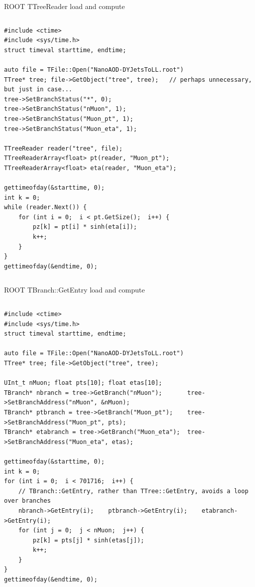 \documentclass[aspectratio=169]{beamer}
\begin{document}
\begin{frame}[fragile]{ROOT TTreeReader load and compute}
\scriptsize
\begin{columns}
\begin{verbatim}
#include <ctime>
#include <sys/time.h>
struct timeval starttime, endtime;

auto file = TFile::Open("NanoAOD-DYJetsToLL.root")
TTree* tree; file->GetObject("tree", tree);   // perhaps unnecessary, but just in case...
tree->SetBranchStatus("*", 0);
tree->SetBranchStatus("nMuon", 1);
tree->SetBranchStatus("Muon_pt", 1);
tree->SetBranchStatus("Muon_eta", 1);

TTreeReader reader("tree", file);
TTreeReaderArray<float> pt(reader, "Muon_pt");
TTreeReaderArray<float> eta(reader, "Muon_eta");

gettimeofday(&starttime, 0);
int k = 0;
while (reader.Next()) {
    for (int i = 0;  i < pt.GetSize();  i++) {
        pz[k] = pt[i] * sinh(eta[i]);
        k++;
    }
}
gettimeofday(&endtime, 0);
\end{verbatim}
\end{columns}
\end{frame}

\begin{frame}[fragile]{ROOT TBranch::GetEntry load and compute}
\vspace{0.2 cm}
\scriptsize
\begin{columns}
\begin{verbatim}
#include <ctime>
#include <sys/time.h>
struct timeval starttime, endtime;

auto file = TFile::Open("NanoAOD-DYJetsToLL.root")
TTree* tree; file->GetObject("tree", tree);

UInt_t nMuon; float pts[10]; float etas[10];
TBranch* nbranch = tree->GetBranch("nMuon");       tree->SetBranchAddress("nMuon", &nMuon);
TBranch* ptbranch = tree->GetBranch("Muon_pt");    tree->SetBranchAddress("Muon_pt", pts);
TBranch* etabranch = tree->GetBranch("Muon_eta");  tree->SetBranchAddress("Muon_eta", etas);

gettimeofday(&starttime, 0);
int k = 0;
for (int i = 0;  i < 701716;  i++) {
    // TBranch::GetEntry, rather than TTree::GetEntry, avoids a loop over branches
    nbranch->GetEntry(i);    ptbranch->GetEntry(i);    etabranch->GetEntry(i);
    for (int j = 0;  j < nMuon;  j++) {
        pz[k] = pts[j] * sinh(etas[j]);
        k++;
    }
}
gettimeofday(&endtime, 0);
\end{verbatim}
\end{columns}
\end{frame}
\end{document}
